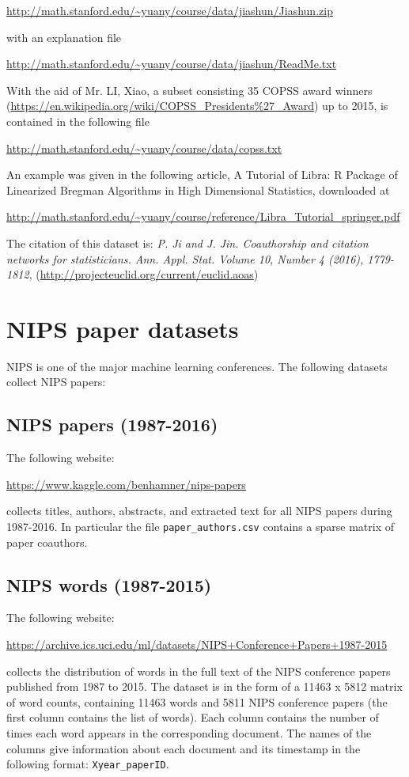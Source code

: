 \documentclass[11pt]{article}
\begin{document}
\url{http://math.stanford.edu/~yuany/course/data/jiashun/Jiashun.zip}

\noindent with an explanation file

\url{http://math.stanford.edu/~yuany/course/data/jiashun/ReadMe.txt}

With the aid of Mr. LI, Xiao, a subset consisting 35 COPSS award winners (\url{https://en.wikipedia.org/wiki/COPSS_Presidents\%27_Award}) up to 2015, is contained in the following file

\url{http://math.stanford.edu/~yuany/course/data/copss.txt} 

\noindent An example was given in the following article, A Tutorial of Libra: R Package of Linearized Bregman Algorithms in High Dimensional Statistics, downloaded at

\url{http://math.stanford.edu/~yuany/course/reference/Libra_Tutorial_springer.pdf}

The citation of this dataset is: \emph{P. Ji and J. Jin. Coauthorship and citation networks for statisticians. Ann. Appl. Stat. Volume 10, Number 4 (2016), 1779-1812}, (\url{http://projecteuclid.org/current/euclid.aoas})

\section{NIPS paper datasets}
NIPS is one of the major machine learning conferences. The following datasets collect NIPS papers:

\subsection{NIPS papers (1987-2016)} The following website: 

\url{https://www.kaggle.com/benhamner/nips-papers}

\noindent collects titles, authors, abstracts, and extracted text for all NIPS papers during 1987-2016. In particular the file {\texttt{paper\_authors.csv}} contains a sparse matrix of paper coauthors. 

\subsection{NIPS words (1987-2015)} The following website:

\url{https://archive.ics.uci.edu/ml/datasets/NIPS+Conference+Papers+1987-2015}

\noindent collects the distribution of words in the full text of the NIPS conference papers published from 1987 to 2015. The dataset is in the form of a 11463 x 5812 matrix of word counts, containing 11463 words and 5811 NIPS conference papers (the first column contains the list of words). Each column contains the number of times each word appears in the corresponding document. The names of the columns give information about each document and its timestamp in the following format: {\texttt{Xyear\_paperID}}. 
\end{document}
